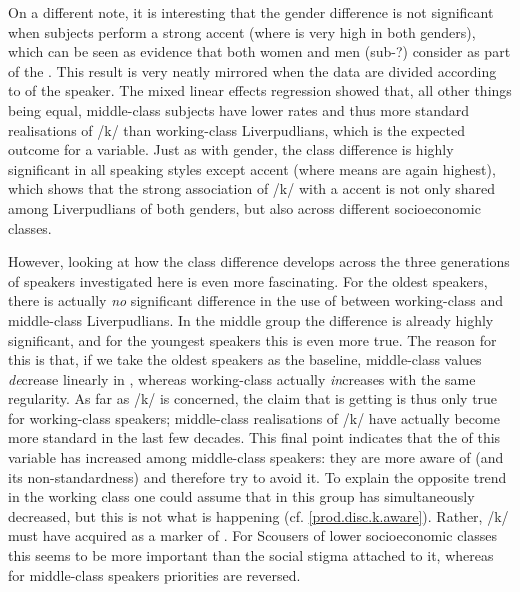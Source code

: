 On a different note, it is interesting that the gender difference is not significant when subjects perform a strong  accent (where  is very high in both genders), which can be seen as evidence that both women and men (sub-?) consider  as part of the  .
This result is very neatly mirrored when the data are divided according to  of the speaker.
The mixed linear effects regression showed that, all other things being equal, middle-class subjects have lower  rates and thus more standard realisations of /k/ than working-class Liverpudlians, which is the expected outcome for a  variable.
Just as with gender, the class difference is highly significant in all speaking styles except accent  (where  means are again highest), which shows that the strong association of /k/  with a   accent is not only shared among Liverpudlians of both genders, but also across different socioeconomic classes.

However, looking at how the class difference develops across the three generations of speakers investigated here is even more fascinating.
For the oldest speakers, there is actually \emph{no} significant difference in the use of  between working-class and middle-class Liverpudlians.
In the middle group the difference is already highly significant, and for the youngest speakers this is even more true.
The reason for this is that, if we take the oldest speakers as the baseline, middle-class  values \emph{de}crease linearly in , whereas working-class  actually \emph{in}creases with the same regularity.
As far as /k/  is concerned, the claim that  is getting  is thus only true for working-class speakers; middle-class realisations of /k/ have actually become more standard in the last few decades.
This final point indicates that the  of this variable has increased among middle-class speakers: they are more aware of  (and its non-standardness) and therefore try to avoid it.
To explain the opposite trend in the working class one could assume that  in this group has simultaneously decreased, but this is not what is happening (cf. \ref{prod.disc.k.aware}).
Rather, /k/  must have acquired   as a marker of .
For Scousers of lower socioeconomic classes this   seems to be more important than the social stigma attached to it, whereas for middle-class speakers priorities are reversed.

